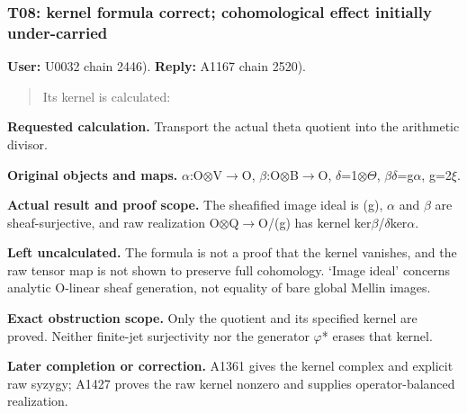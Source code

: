 \subsubsection{T08: kernel formula correct; cohomological effect
initially
under-carried}\label{TranscriptLedgerStage:t08-kernel-formula-correct-cohomological-effect-initially-under-carried}

\textbf{User:} U0032
\protect{} chain 2446).
\textbf{Reply:} A1167
\protect{} chain 2520).

\begin{quote}
Its kernel is calculated:
\end{quote}

\textbf{Requested calculation.} Transport the actual theta quotient into
the arithmetic divisor.

\textbf{Original objects and maps.}
\allowbreak{}\ensuremath{α}\allowbreak{}:O\allowbreak{}\ensuremath{⊗}\allowbreak{}V\allowbreak{}\ensuremath{→}\allowbreak{}O,
\allowbreak{}\ensuremath{β}\allowbreak{}:O\allowbreak{}\ensuremath{⊗}\allowbreak{}B\allowbreak{}\ensuremath{→}\allowbreak{}O,
\allowbreak{}\ensuremath{δ}\allowbreak{}=1\allowbreak{}\ensuremath{⊗}\allowbreak{}\allowbreak{}\ensuremath{Θ}\allowbreak{},
\allowbreak{}\ensuremath{β}\allowbreak{}\allowbreak{}\ensuremath{δ}\allowbreak{}=g\allowbreak{}\ensuremath{α}\allowbreak{},
g=2\allowbreak{}\ensuremath{ξ}\allowbreak{}.

\textbf{Actual result and proof scope.} The sheafified image ideal is
(g), \allowbreak{}\ensuremath{α}\allowbreak{} and
\allowbreak{}\ensuremath{β}\allowbreak{} are sheaf-surjective, and raw
realization
O\allowbreak{}\ensuremath{⊗}\allowbreak{}Q\allowbreak{}\ensuremath{→}\allowbreak{}O/(g)
has kernel
ker\allowbreak{}\ensuremath{β}\allowbreak{}/\allowbreak{}\ensuremath{δ}\allowbreak{}ker\allowbreak{}\ensuremath{α}\allowbreak{}.

\textbf{Left uncalculated.} The formula is not a proof that the kernel
vanishes, and the raw tensor map is not shown to preserve full
cohomology. `Image ideal' concerns analytic O-linear sheaf generation,
not equality of bare global Mellin images.

\textbf{Exact obstruction scope.} Only the quotient and its specified
kernel are proved. Neither finite-jet surjectivity nor the generator
\allowbreak{}\ensuremath{φ}\allowbreak{}* erases that kernel.

\textbf{Later completion or correction.} A1361 gives the kernel complex
and explicit raw syzygy; A1427 proves the raw kernel nonzero and
supplies operator-balanced realization.

